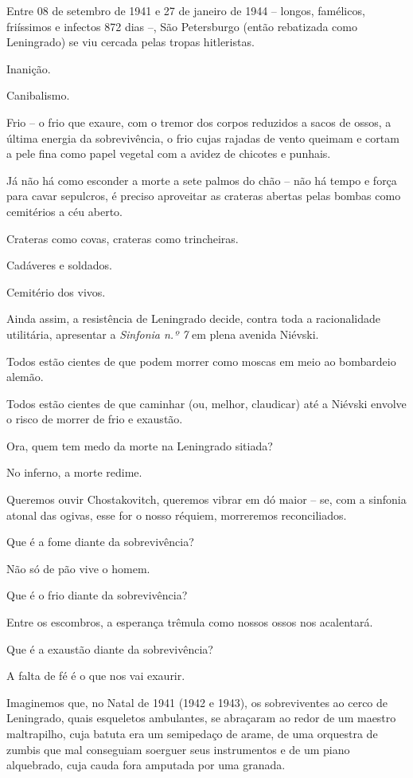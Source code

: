 Entre 08 de setembro de 1941 e 27 de janeiro de 1944 -- longos,
famélicos, friíssimos e infectos 872 dias --, São Petersburgo (então
rebatizada como Leningrado) se viu cercada pelas tropas hitleristas.

Inanição.

Canibalismo.

Frio -- o frio que exaure, com o tremor dos corpos reduzidos a sacos de
ossos, a última energia da sobrevivência, o frio cujas rajadas de vento
queimam e cortam a pele fina como papel vegetal com a avidez de chicotes
e punhais.

Já não há como esconder a morte a sete palmos do chão -- não há tempo e
força para cavar sepulcros, é preciso aproveitar as crateras abertas
pelas bombas como cemitérios a céu aberto.

Crateras como covas, crateras como trincheiras.

Cadáveres e soldados.

Cemitério dos vivos.

Ainda assim, a resistência de Leningrado decide, contra toda a
racionalidade utilitária, apresentar a \emph{Sinfonia n.º 7} em plena
avenida Niévski.

Todos estão cientes de que podem morrer como moscas em meio ao
bombardeio alemão.

Todos estão cientes de que caminhar (ou, melhor, claudicar) até a
Niévski envolve o risco de morrer de frio e exaustão.

Ora, quem tem medo da morte na Leningrado sitiada?

No inferno, a morte redime.

Queremos ouvir Chostakovitch, queremos vibrar em dó maior -- se, com a
sinfonia atonal das ogivas, esse for o nosso réquiem, morreremos
reconciliados.

Que é a fome diante da sobrevivência?

Não só de pão vive o homem.

Que é o frio diante da sobrevivência?

Entre os escombros, a esperança trêmula como nossos ossos nos
acalentará.

Que é a exaustão diante da sobrevivência?

A falta de fé é o que nos vai exaurir.

Imaginemos que, no Natal de 1941 (1942 e 1943), os sobreviventes ao
cerco de Leningrado, quais esqueletos ambulantes, se abraçaram ao redor
de um maestro maltrapilho, cuja batuta era um semipedaço de arame, de
uma orquestra de zumbis que mal conseguiam soerguer seus instrumentos e
de um piano alquebrado, cuja cauda fora amputada por uma granada.

